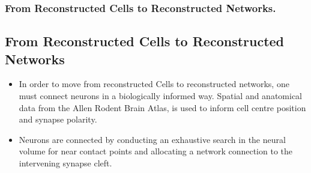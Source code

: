 \documentclass{beamer}
\begin{document}
\begin{frame}
\frametitle{From Reconstructed Cells to Reconstructed Networks.}
\subsection{From Reconstructed Cells to Reconstructed Networks}
\begin{itemize}
\vfill \item In order to move from reconstructed Cells to reconstructed networks, one must connect neurons in a biologically informed way. Spatial and anatomical data from the Allen Rodent Brain Atlas, is used to inform cell centre position and synapse polarity.

\vfill \item Neurons are connected by conducting an exhaustive search in the neural volume for near contact points and allocating a network connection to the intervening synapse cleft.

\end{itemize}
\end{frame}



\end{document}
